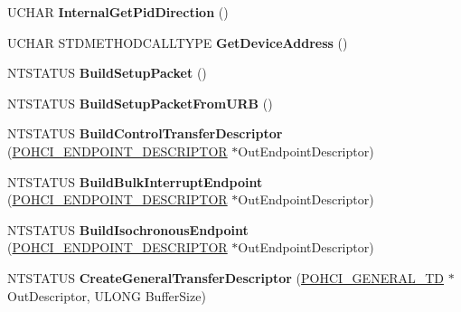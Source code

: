 \begin{DoxyCompactItemize}
U\+C\+H\+AR {\bfseries Internal\+Get\+Pid\+Direction} ()
\item 
\mbox{\label{class_c_u_s_b_request_a0a16609ad1cbd79c17b31522b76bd3dd}} 
U\+C\+H\+AR S\+T\+D\+M\+E\+T\+H\+O\+D\+C\+A\+L\+L\+T\+Y\+PE {\bfseries Get\+Device\+Address} ()
\item 
\mbox{\label{class_c_u_s_b_request_a3b5a481af7c99db9a583bd1442a338f7}} 
N\+T\+S\+T\+A\+T\+US {\bfseries Build\+Setup\+Packet} ()
\item 
\mbox{\label{class_c_u_s_b_request_a368b9e19db90a8cbcc7308c47b559034}} 
N\+T\+S\+T\+A\+T\+US {\bfseries Build\+Setup\+Packet\+From\+U\+RB} ()
\item 
\mbox{\label{class_c_u_s_b_request_a6716db11f283a08256d2c492f63694da}} 
N\+T\+S\+T\+A\+T\+US {\bfseries Build\+Control\+Transfer\+Descriptor} (\hyperlink{struct___o_h_c_i___e_n_d_p_o_i_n_t___d_e_s_c_r_i_p_t_o_r}{P\+O\+H\+C\+I\+\_\+\+E\+N\+D\+P\+O\+I\+N\+T\+\_\+\+D\+E\+S\+C\+R\+I\+P\+T\+OR} $\ast$Out\+Endpoint\+Descriptor)
\item 
\mbox{\label{class_c_u_s_b_request_adf556cf1f0baf513c7925f1c9831259e}} 
N\+T\+S\+T\+A\+T\+US {\bfseries Build\+Bulk\+Interrupt\+Endpoint} (\hyperlink{struct___o_h_c_i___e_n_d_p_o_i_n_t___d_e_s_c_r_i_p_t_o_r}{P\+O\+H\+C\+I\+\_\+\+E\+N\+D\+P\+O\+I\+N\+T\+\_\+\+D\+E\+S\+C\+R\+I\+P\+T\+OR} $\ast$Out\+Endpoint\+Descriptor)
\item 
\mbox{\label{class_c_u_s_b_request_a8232d78cee44975e1271efc089067768}} 
N\+T\+S\+T\+A\+T\+US {\bfseries Build\+Isochronous\+Endpoint} (\hyperlink{struct___o_h_c_i___e_n_d_p_o_i_n_t___d_e_s_c_r_i_p_t_o_r}{P\+O\+H\+C\+I\+\_\+\+E\+N\+D\+P\+O\+I\+N\+T\+\_\+\+D\+E\+S\+C\+R\+I\+P\+T\+OR} $\ast$Out\+Endpoint\+Descriptor)
\item 
\mbox{\label{class_c_u_s_b_request_aba80530489f9fc4a13f6e97ae9dee2d2}} 
N\+T\+S\+T\+A\+T\+US {\bfseries Create\+General\+Transfer\+Descriptor} (\hyperlink{struct_o_h_c_i___g_e_n_e_r_a_l___t_d}{P\+O\+H\+C\+I\+\_\+\+G\+E\+N\+E\+R\+A\+L\+\_\+\+TD} $\ast$Out\+Descriptor, U\+L\+O\+NG Buffer\+Size)
\item 

\end{DoxyCompactItemize}
